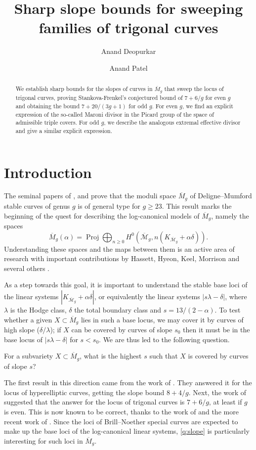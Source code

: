 \documentclass{amsart}
\title{Sharp slope bounds for sweeping families of trigonal curves}
\author{Anand Deopurkar \and Anand Patel}
\newcommand{\orb}[1]{{\mathcal #1}}     %
\renewcommand {\o}[1]{\overline{#1}}
\DeclareMathOperator{\proj}{Proj}
\renewcommand{\o}{\overline}
\begin{document}
\maketitle
\begin{abstract}
  We establish sharp bounds for the slopes of curves in $\o M_g$ that
  sweep the locus of trigonal curves, proving Stankova-Frenkel's
  conjectured bound of $7+6/g$ for even $g$ and obtaining the bound
  $7+20/(3g+1)$ for odd $g$. For even $g$, we find an explicit
  expression of the so-called Maroni divisor in the Picard group of
  the space of admissible triple covers. For odd $g$, we describe the
  analogous extremal effective divisor and give a similar explicit
  expression.
\end{abstract}
\section{Introduction}
The seminal papers of
\citet{harris82:_kodair_dimen_of_modul_space_of_curves}, and
\citet{eisenbud87:_kodair} prove that the moduli space $\o M_g$ of
Deligne--Mumford stable curves of genus $g$ is of general type for $g
\geq 23$. This result marks the beginning of the quest for describing
the log-canonical models of $\o M_g$, namely the spaces
\[ \o M_g(\alpha) = \proj \bigoplus_{n \geq 0} H^0\left(\o {\orb M}_g,
  n(K_{\o {\orb M}_g} + \alpha \delta)\right).\] Understanding these
spaces and the maps between them is an active area of
research with important contributions by Hassett, Hyeon, Keel,
Morrison and several others
\citep{fedorchuk12:_alter_compac_modul_spaces_curves}.

As a step towards this goal, it is important to understand the stable
base loci of the linear systems $|K_{\o {\orb M}_g} + \alpha \delta|$,
or equivalently the linear systems $|s\lambda - \delta|$, where
$\lambda$ is the Hodge class, $\delta$ the total boundary class and
$s = 13/(2-\alpha)$. To test whether a given $X \subset \o M_g$ lies
in such a base locus, we may cover it by curves of high slope
($\delta/\lambda$); if $X$ can be covered by curves of slope $s_0$
then it must be in the base locus of $|s\lambda-\delta|$ for $s <
s_0$. We are thus led to the following question.
\begin{question}\label{q:slope}
  For a subvariety $X \subset \o M_g$, what is the highest $s$ such
  that $X$ is covered by curves of slope $s$?
\end{question}
The first result in this direction came from the work of \citet{cornalba88:_divis}. They answered it for the locus of hyperelliptic curves, getting the slope bound $8+4/g$. Next, the work of \citet{Stankova-Frenkel00:_Modul_Of_Trigon_Curves} suggested that the answer for the locus of trigonal curves is $7+6/g$, at least if $g$ is even. This is now known to be correct, thanks to the work of \citet[Theorem~1.6]{barja09:_slopes} and the more recent work of \citet[Theorem~1.2, Corollary~3.2]{fedorchuk12:_stabil_hilber_point_canon_curves}. Since the loci of Brill--Noether special curves are expected to make up the base loci of the log-canonical linear systems, \autoref{q:slope} is particularly interesting for such loci in $\o M_g$.
\end{document}
